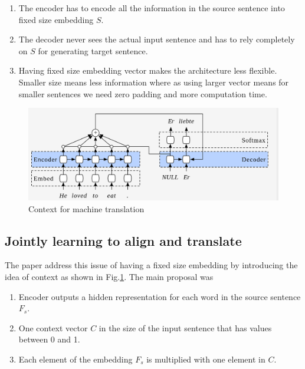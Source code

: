 \documentclass[a4paper]{article}
\begin{document}
\begin{enumerate}
  \item The  encoder  has to  encode all the  information in the source sentence
        into fixed size embedding $S$.
  \item The decoder  never  sees  the  actual  input  sentence  and  has to rely
        completely on $S$ for generating target sentence.
  \item Having fixed size embedding vector makes the architecture less flexible.
        Smaller size means less  information where  as using larger vector means
        for smaller sentences we need zero padding and more computation time.
\end{enumerate}


\begin{figure}
  \includegraphics[width=.99\linewidth]{img/context.png}
  \caption{Context for machine translation}
  \label{fig:context}
\end{figure}


\subsection{Jointly learning to align and translate} \label{sec:JT}

The paper  \cite{bahdanau2014neural} address this issue  of having a  fixed size
embedding by introducing the idea of context  as shown in Fig.\ref{fig:context}.
The main proposal was


\begin{enumerate}
  \item Encoder  outputs a  hidden  representation  for  each word in the source
        sentence $F_s$.
  \item One context vector $C$ in the size of the input sentence that has values
        between 0 and 1.
  \item Each element of the embedding  $F_s$  is multiplied with one  element in
        $C$.
\end{enumerate}
\end{document}
